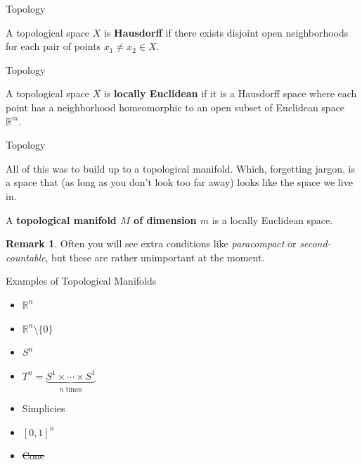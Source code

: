 \documentclass[usenames,dvipsnames]{beamer}
\theoremstyle{definition}
\newtheorem*{remark}{Remark}
\theoremstyle{theorem}
\newcommand{\R}{\mathbb{R}}
\begin{document}
        \begin{frame}{Topology}
            \begin{definition}
                A topological space $X$ is \textbf{Hausdorff} if there exists disjoint open neighborhoods for each pair of points $x_1\neq x_2 \in X$.
            \end{definition}
        \end{frame}
        
        \begin{frame}{Topology}
            \begin{definition}
                A topological space $X$ is \textbf{locally Euclidean} if it is a Hausdorff space where each point has a neighborhood homeomorphic to an open subset of Euclidean space $\R^m$.
            \end{definition}
        \end{frame}
        
        \begin{frame}{Topology}
            \begin{paragraph}
                All of this was to build up to a topological manifold.  Which, forgetting jargon, is a space that  (as long as you don't look too far away) looks like the space we live in.
            \end{paragraph}
            \begin{definition}
                A \textbf{topological manifold $M$ of dimension $m$} is a locally Euclidean space.  
            \end{definition}
            \begin{remark}
                Often you will see extra conditions like \emph{paracompact} or \emph{second-countable}, but these are rather unimportant at the moment.
            \end{remark}
        \end{frame}
        
        \begin{frame}{Examples of Topological Manifolds}
            \begin{itemize}
                \item $\R^n$
                \item $\R^n\setminus \{0\}$
                \item $S^n$
                \item $T^n = \underbrace{S^1 \times \cdots \times S^1}_{\textrm{$n$ times}}$
                \item Simplicies
                \item $[0,1]^n$
                \item \st{Cone}
            \end{itemize}
        \end{frame}
        
\end{document}
